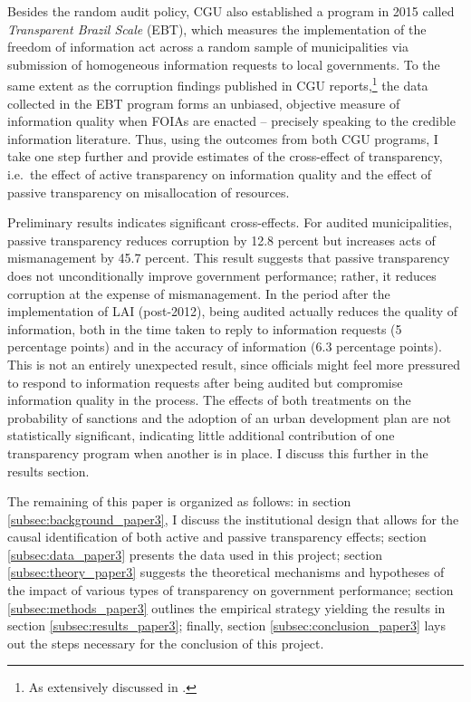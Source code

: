 \documentclass[11pt]{article}
\begin{document}
Besides the random audit policy, CGU also established a program in 2015 called \emph{Transparent Brazil Scale} (EBT), which measures the implementation of the freedom of information act across a random sample of municipalities via submission of homogeneous information requests to local governments. To the same extent as the corruption findings published in CGU reports,\footnote{As extensively discussed in \citet{FerrazExposingCorruptPoliticians2008b,FerrazElectoralAccountabilityCorruption2011a,BrolloPoliticalResourceCurse2013,ZamboniAuditRiskRent2018,FinanGovernmentAuditsReduce2018}.} the data collected in the EBT program forms an unbiased, objective measure of information quality when FOIAs are enacted -- precisely speaking to the credible information literature. Thus, using the outcomes from both CGU programs, I take one step further and provide estimates of the cross-effect of transparency, i.e.~the effect of active transparency on information quality and the effect of passive transparency on misallocation of resources.

Preliminary results indicates significant cross-effects. For audited municipalities, passive transparency reduces corruption by 12.8 percent but increases acts of mismanagement by 45.7 percent. This result suggests that passive transparency does not unconditionally improve government performance; rather, it reduces corruption at the expense of mismanagement. In the period after the implementation of LAI (post-2012), being audited actually reduces the quality of information, both in the time taken to reply to information requests (5 percentage points) and in the accuracy of information (6.3 percentage points). This is not an entirely unexpected result, since officials might feel more pressured to respond to information requests after being audited but compromise information quality in the process. The effects of both treatments on the probability of sanctions and the adoption of an urban development plan are not statistically significant, indicating little additional contribution of one transparency program when another is in place. I discuss this further in the results section.

The remaining of this paper is organized as follows: in section \ref{subsec:background_paper3}, I discuss the institutional design that allows for the causal identification of both active and passive transparency effects; section \ref{subsec:data_paper3} presents the data used in this project; section \ref{subsec:theory_paper3} suggests the theoretical mechanisms and hypotheses of the impact of various types of transparency on government performance; section \ref{subsec:methods_paper3} outlines the empirical strategy yielding the results in section \ref{subsec:results_paper3}; finally, section \ref{subsec:conclusion_paper3} lays out the steps necessary for the conclusion of this project.
\end{document}
